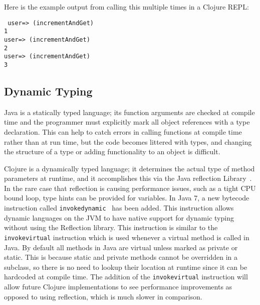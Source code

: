 Here is the example output from calling this multiple times in a
Clojure REPL:

\lstset{language=Clojure}
\begin{lstlisting}
 user=> (incrementAndGet)
1
user=> (incrementAndGet)
2
user=> (incrementAndGet)
3
\end{lstlisting}
 
\subsection{Dynamic Typing}
Java is a statically typed language; its function arguments are
checked at compile time and the programmer must explicitly mark all
object references with a
type declaration. 
This can help to catch errors in calling functions at compile time
rather than at run time, but the code becomes littered with types, and
changing the structure of a type or adding functionality to an object
is difficult. 
    
Clojure is a dynamically typed language; it determines the actual type
of method parameters at runtime, and it accomplishes this via the Java
reflection Library~\cite{reflection}. 
In the rare case that reflection is causing performance issues, such
as a tight CPU bound loop, type hints can be provided for variables. 
In Java 7, a new bytecode instruction called
{\tt invokedynamic}~\cite{invokedynamic} has been added.
This instruction allows dynamic
languages on the JVM to have native support for dynamic typing without
using the Reflection library. 
This instruction is similar to the {\tt invokevirtual} instruction which is
used whenever a virtual method is called in Java. 
By default all methods in Java are virtual unless marked as private or static. 
This is because static and private methods cannot be overridden in a
subclass, so there is no need to lookup their location at runtime
since it can be hardcoded at compile time. 
The addition of the {\tt invokevirtual} instruction will allow future Clojure implementations to see performance improvements as opposed to using reflection, which is much slower in comparison.  

